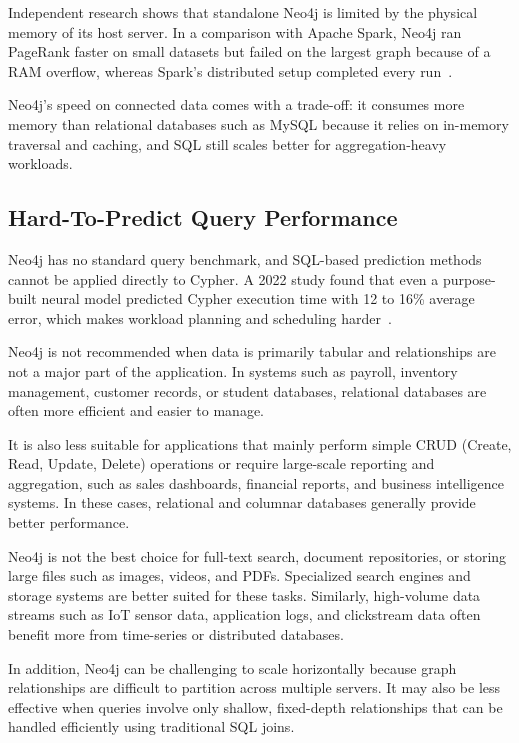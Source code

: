 \documentclass[11pt,a4paper]{article}
\begin{document}
Independent research shows that standalone Neo4j is limited by the physical memory of its host server. In a comparison with Apache Spark, Neo4j ran PageRank faster on small datasets but failed on the largest graph because of a RAM overflow, whereas Spark's distributed setup completed every run~\cite{ballas2020assessing}.

Neo4j's speed on connected data comes with a trade-off: it consumes more memory than relational databases such as MySQL because it relies on in-memory traversal and caching, and SQL still scales better for aggregation-heavy workloads.

\subsection{Hard-To-Predict Query Performance}

Neo4j has no standard query benchmark, and SQL-based prediction methods cannot be applied directly to Cypher. A 2022 study found that even a purpose-built neural model predicted Cypher execution time with 12 to 16\% average error, which makes workload planning and scheduling harder~\cite{he2022execution}.

Neo4j is not recommended when data is primarily tabular and relationships are not a major part of the application. In systems such as payroll, inventory management, customer records, or student databases, relational databases are often more efficient and easier to manage.

It is also less suitable for applications that mainly perform simple CRUD (Create, Read, Update, Delete) operations or require large-scale reporting and aggregation, such as sales dashboards, financial reports, and business intelligence systems. In these cases, relational and columnar databases generally provide better performance.

Neo4j is not the best choice for full-text search, document repositories, or storing large files such as images, videos, and PDFs. Specialized search engines and storage systems are better suited for these tasks. Similarly, high-volume data streams such as IoT sensor data, application logs, and clickstream data often benefit more from time-series or distributed databases.

In addition, Neo4j can be challenging to scale horizontally because graph relationships are difficult to partition across multiple servers. It may also be less effective when queries involve only shallow, fixed-depth relationships that can be handled efficiently using traditional SQL joins.
\end{document}
